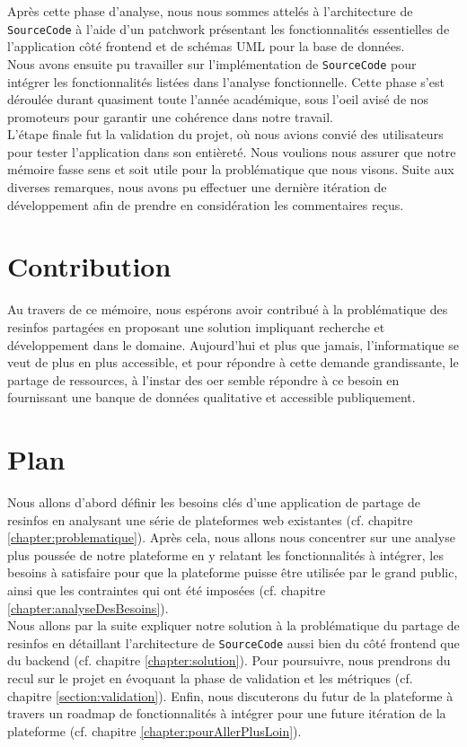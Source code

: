 Après cette phase d'analyse, nous nous sommes attelés à l'architecture de \texttt{SourceCode} à l'aide d'un patchwork présentant les fonctionnalités essentielles de l'application côté \gls{frontend} et de schémas UML pour la base de données.\\

Nous avons ensuite pu travailler sur l'implémentation de \texttt{SourceCode} pour intégrer les fonctionnalités listées dans l'analyse fonctionnelle. Cette phase s'est déroulée durant quasiment toute l'année académique, sous l'oeil avisé de nos promoteurs pour garantir une cohérence dans notre travail.\\

L'étape finale fut la validation du projet, où nous avions convié des utilisateurs pour tester l'application dans son entièreté. Nous voulions nous assurer que notre mémoire fasse sens et soit utile pour la problématique que nous visons. Suite aux diverses remarques, nous avons pu effectuer une dernière itération de développement afin de prendre en considération les commentaires reçus.

\section*{Contribution}

Au travers de ce mémoire, nous espérons avoir contribué à la problématique des \glspl{resinfo} partagées en proposant une solution impliquant recherche et développement dans le domaine. Aujourd’hui et plus que jamais, l'informatique se veut de plus en plus accessible, et pour répondre à cette demande grandissante, le partage de ressources, à l'instar des \gls{oer} semble répondre à ce besoin en fournissant une banque de données qualitative et accessible publiquement.

\section*{Plan}

Nous allons d'abord définir les besoins clés d'une application de partage de \glspl{resinfo} en analysant une série de plateformes web existantes (cf. chapitre \ref{chapter:problematique}).
Après cela, nous allons nous concentrer sur une analyse plus poussée de notre plateforme en y relatant les fonctionnalités à intégrer, les besoins à satisfaire pour que la plateforme puisse être utilisée par le grand public, ainsi que les contraintes qui ont été imposées (cf. chapitre \ref{chapter:analyseDesBesoins}).\\

Nous allons par la suite expliquer notre solution à la problématique du partage de \glspl{resinfo} en détaillant l'architecture de \texttt{SourceCode} aussi bien du côté \gls{frontend} que du \gls{backend} (cf. chapitre \ref{chapter:solution}).
Pour poursuivre, nous prendrons du recul sur le projet en évoquant la phase de validation et les métriques (cf. chapitre \ref{section:validation}). 
Enfin, nous discuterons du futur de la plateforme à travers un roadmap de fonctionnalités à intégrer pour une future itération de la plateforme (cf. chapitre \ref{chapter:pourAllerPlusLoin}).
